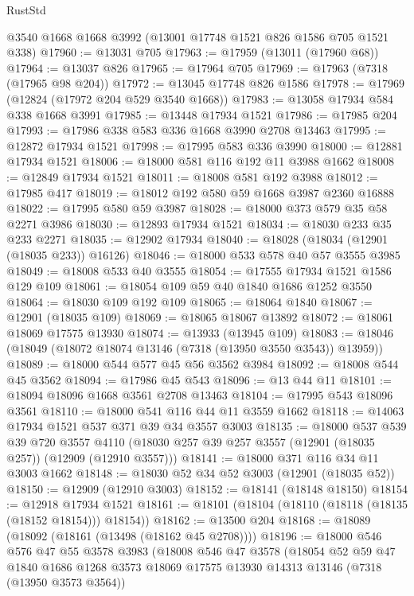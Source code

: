 \begin{lexlean}{RustStd}
\begin{coremodule}
    @3540
    @1668
    @1668
    @3992
    (@13001 @17748 @1521 @826 @1586 @705 @1521 @338)
@17960 := @13031 @705
@17963 := @17959 (@13011 (@17960 @68))
@17964 := @13037 @826
@17965 := @17964 @705
@17969 := @17963 (@7318 (@17965 @98 @204))
@17972 := @13045 @17748 @826 @1586
@17978 := @17969 (@12824 (@17972 @204 @529 @3540 @1668))
@17983 := @13058 @17934 @584 @338 @1668 @3991
@17985 := @13448 @17934 @1521
@17986 := @17985 @204
@17993 := @17986 @338 @583 @336 @1668 @3990 @2708 @13463
@17995 := @12872 @17934 @1521
@17998 := @17995 @583 @336 @3990
@18000 := @12881 @17934 @1521
@18006 := @18000 @581 @116 @192 @11 @3988 @1662
@18008 := @12849 @17934 @1521
@18011 := @18008 @581 @192 @3988
@18012 := @17985 @417
@18019 := @18012 @192 @580 @59 @1668 @3987 @2360 @16888
@18022 := @17995 @580 @59 @3987
@18028 := @18000 @373 @579 @35 @58 @2271 @3986
@18030 := @12893 @17934 @1521
@18034 := @18030 @233 @35 @233 @2271
@18035 := @12902 @17934
@18040 := @18028 (@18034 (@12901 (@18035 @233)) @16126)
@18046 := @18000 @533 @578 @40 @57 @3555 @3985
@18049 := @18008 @533 @40 @3555
@18054 := @17555 @17934 @1521 @1586 @129 @109
@18061 := @18054 @109 @59 @40 @1840 @1686 @1252 @3550
@18064 := @18030 @109 @192 @109
@18065 := @18064 @1840
@18067 := @12901 (@18035 @109)
@18069 := @18065 @18067 @13892
@18072 := @18061 @18069 @17575 @13930
@18074 := @13933 (@13945 @109)
@18083 := @18046 (@18049 (@18072 @18074 @13146 (@7318 (@13950 @3550 @3543)) @13959))
@18089 := @18000 @544 @577 @45 @56 @3562 @3984
@18092 := @18008 @544 @45 @3562
@18094 := @17986 @45 @543
@18096 := @13 @44 @11
@18101 := @18094 @18096 @1668 @3561 @2708 @13463
@18104 := @17995 @543 @18096 @3561
@18110 := @18000 @541 @116 @44 @11 @3559 @1662
@18118 := @14063 @17934 @1521 @537 @371 @39 @34 @3557 @3003
@18135 := @18000
    @537
    @539
    @39
    @720
    @3557
    @4110
    (@18030 @257 @39 @257 @3557 (@12901 (@18035 @257)) (@12909 (@12910 @3557)))
@18141 := @18000 @371 @116 @34 @11 @3003 @1662
@18148 := @18030 @52 @34 @52 @3003 (@12901 (@18035 @52))
@18150 := @12909 (@12910 @3003)
@18152 := @18141 (@18148 @18150)
@18154 := @12918 @17934 @1521
@18161 := @18101 (@18104 (@18110 (@18118 (@18135 (@18152 @18154))) @18154))
@18162 := @13500 @204
@18168 := @18089 (@18092 (@18161 (@13498 (@18162 @45 @2708))))
@18196 := @18000
    @546
    @576
    @47
    @55
    @3578
    @3983
    (@18008
      @546
      @47
      @3578
      (@18054
        @52
        @59
        @47
        @1840
        @1686
        @1268
        @3573
        @18069
        @17575
        @13930
        @14313
        @13146
        (@7318 (@13950 @3573 @3564))

\end{coremodule}
\end{lexlean}
